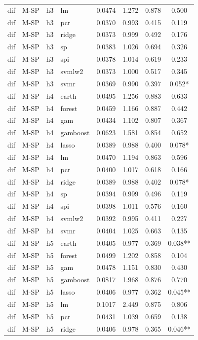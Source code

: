 \begin{ThreePartTable}
\begin{longtable}[t]{llclcccc}
dif & M-SP & h3 & lm & 0.0474 & 1.272 & 0.878 & 0.500\\
dif & M-SP & h3 & pcr & 0.0370 & 0.993 & 0.415 & 0.119\\
dif & M-SP & h3 & ridge & 0.0373 & 0.999 & 0.492 & 0.176\\
dif & M-SP & h3 & sp & 0.0383 & 1.026 & 0.694 & 0.326\\
dif & M-SP & h3 & spi & 0.0378 & 1.014 & 0.619 & 0.233\\
dif & M-SP & h3 & svmlw2 & 0.0373 & 1.000 & 0.517 & 0.345\\
dif & M-SP & h3 & svmr & 0.0369 & 0.990 & 0.397 & 0.052*\\
\addlinespace
dif & M-SP & h4 & earth & 0.0495 & 1.256 & 0.883 & 0.633\\
dif & M-SP & h4 & forest & 0.0459 & 1.166 & 0.887 & 0.442\\
dif & M-SP & h4 & gam & 0.0434 & 1.102 & 0.807 & 0.367\\
dif & M-SP & h4 & gamboost & 0.0623 & 1.581 & 0.854 & 0.652\\
dif & M-SP & h4 & lasso & 0.0389 & 0.988 & 0.400 & 0.078*\\
dif & M-SP & h4 & lm & 0.0470 & 1.194 & 0.863 & 0.596\\
dif & M-SP & h4 & pcr & 0.0400 & 1.017 & 0.618 & 0.166\\
dif & M-SP & h4 & ridge & 0.0389 & 0.988 & 0.402 & 0.078*\\
dif & M-SP & h4 & sp & 0.0394 & 0.999 & 0.496 & 0.119\\
dif & M-SP & h4 & spi & 0.0398 & 1.011 & 0.576 & 0.160\\
dif & M-SP & h4 & svmlw2 & 0.0392 & 0.995 & 0.411 & 0.227\\
dif & M-SP & h4 & svmr & 0.0404 & 1.025 & 0.663 & 0.135\\
\addlinespace
dif & M-SP & h5 & earth & 0.0405 & 0.977 & 0.369 & 0.038**\\
dif & M-SP & h5 & forest & 0.0499 & 1.202 & 0.858 & 0.104\\
dif & M-SP & h5 & gam & 0.0478 & 1.151 & 0.830 & 0.430\\
dif & M-SP & h5 & gamboost & 0.0817 & 1.968 & 0.876 & 0.770\\
dif & M-SP & h5 & lasso & 0.0406 & 0.977 & 0.362 & 0.045**\\
dif & M-SP & h5 & lm & 0.1017 & 2.449 & 0.875 & 0.806\\
dif & M-SP & h5 & pcr & 0.0431 & 1.039 & 0.659 & 0.138\\
dif & M-SP & h5 & ridge & 0.0406 & 0.978 & 0.365 & 0.046**\\

\end{longtable}
\end{ThreePartTable}
